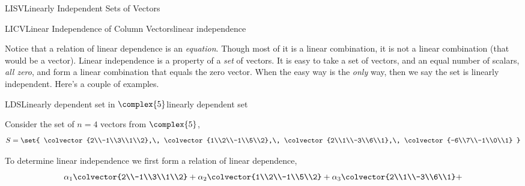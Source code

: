 \begin{subsect}{LISV}{Linearly Independent Sets of Vectors}
\begin{definition}{LICV}{Linear Independence of Column Vectors}{linear independence}
\end{definition}
%
\begin{para}Notice that a relation of linear dependence is an {\em equation}.  Though most of it is a linear combination, it is not a linear combination (that would be a vector).  Linear independence is a property of a {\em set} of vectors.  It is easy to take a set of vectors, and an equal number of scalars, {\em all zero}, and form a linear combination that equals the zero vector.  When the easy way is the {\em only} way, then we say the set is linearly independent.  Here's a couple of examples.\end{para}
%
\begin{example}{LDS}{Linearly dependent set in $\complex{5}$}{linearly dependent set}
\begin{para}Consider the set of $n=4$ vectors from $\complex{5}$,
%
\begin{equation*}
S=\set{
\colvector{2\\-1\\3\\1\\2},\,
\colvector{1\\2\\-1\\5\\2},\,
\colvector{2\\1\\-3\\6\\1},\,
\colvector{-6\\7\\-1\\0\\1}
}
\end{equation*}
\end{para}
%
\begin{para}To determine linear independence we first form a relation of linear dependence,
%
\begin{equation*}
\alpha_1\colvector{2\\-1\\3\\1\\2}+
\alpha_2\colvector{1\\2\\-1\\5\\2}+
\alpha_3\colvector{2\\1\\-3\\6\\1}+

\end{equation*}
\end{para}
\end{example}
\end{subsect}
